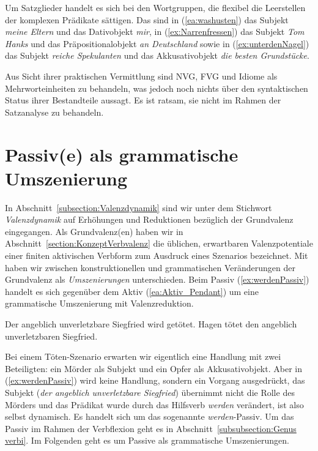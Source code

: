 \ea \label{ea:Idiomefixiert} 
\label{ea:Worthusten}
\label{ex:Wenfressen}
\label{ex:unterdenlangenNagel} 
\z 
\z

Um Satzglieder handelt es sich bei den Wortgruppen, die flexibel die Leerstellen der komplexen Prädikate sättigen. Das sind in (\ref{ea:washusten}) das Subjekt \textit{meine Eltern} und das Dativobjekt \textit{mir}, in (\ref{ex:Narrenfressen}) das Subjekt \textit{Tom Hanks} und das Präpositionalobjekt \textit{an Deutschland} sowie in (\ref{ex:unterdenNagel}) das Subjekt \textit{reiche Spekulanten} und das Akkusativobjekt \textit{die besten Grundstücke}.

Aus Sicht ihrer praktischen Vermittlung sind NVG, FVG und Idiome als Mehrworteinheiten zu behandeln, was jedoch noch nichts über den syntaktischen Status ihrer Bestandteile aussagt. Es ist ratsam, sie nicht im Rahmen der Satzanalyse zu behandeln.


\section{Passiv(e) als grammatische Umszenierung}\label{subsection:Passiv}

In Abschnitt~\ref{subsection:Valenzdynamik} sind wir unter dem Stichwort \textit{Valenzdynamik} auf Erhöhungen und Reduktionen bezüglich der Grundvalenz eingegangen. Als Grundvalenz(en) haben wir in Abschnitt~\ref{section:KonzeptVerbvalenz} die üblichen, erwartbaren Valenzpotentiale einer finiten aktivischen Verbform zum Ausdruck eines Szenarios bezeichnet. Mit \citet[47--54]{Agel2017} haben wir zwischen konstruktionellen und grammatischen Veränderungen der Grundvalenz als \textit{Umszenierungen} unterschieden. Beim Passiv (\ref{ex:werdenPassiv}) handelt es sich gegenüber dem Aktiv (\ref{ea:Aktiv_Pendant}) um eine grammatische Umszenierung mit Valenzreduktion.

\ea \label{ea:dynSG}
\ea \label{ex:werdenPassiv} Der angeblich unverletzbare Siegfried wird getötet. 
\ex \label{ea:Aktiv_Pendant} Hagen tötet den angeblich unverletzbaren Siegfried.
\z 
\z 

Bei einem Töten-Szenario erwarten wir eigentlich eine Handlung mit zwei Beteiligten: ein Mörder als Subjekt und ein Opfer als Akkusativobjekt. Aber in (\ref{ex:werdenPassiv}) wird keine Handlung, sondern ein Vorgang ausgedrückt, das Subjekt (\textit{der angeblich unverletzbare Siegfried}) übernimmt nicht die Rolle des Mörders und das Prädikat wurde durch das Hilfsverb \textit{werden} verändert, ist also selbst dynamisch. Es handelt sich um das sogenannte \textit{werden}-Passiv. Um das Passiv im Rahmen der Verbflexion geht es in Abschnitt~\ref{subsubsection:Genus verbi}. Im Folgenden geht es um Passive als grammatische Umszenierungen. 



